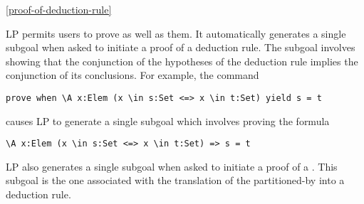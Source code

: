 \ref{proof-of-deduction-rule}

LP permits users to prove  as well as
 them.  It automatically generates a single subgoal when asked to
initiate a proof of a deduction rule.  The subgoal involves showing that the
conjunction of the hypotheses of the deduction rule implies the conjunction of
its conclusions.
\p
For example, the command
\begin{verbatim}
prove when \A x:Elem (x \in s:Set <=> x \in t:Set) yield s = t
\end{verbatim}
causes LP to generate a single subgoal which involves proving the formula
\begin{verbatim}
\A x:Elem (x \in s:Set <=> x \in t:Set) => s = t
\end{verbatim}
\p
LP also generates a single subgoal when asked to initiate a proof of a
.  This subgoal is the one associated
with the translation of the partitioned-by into a deduction rule.

